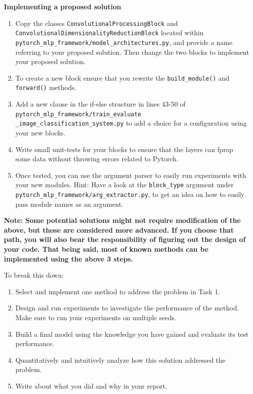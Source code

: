 \documentclass[11pt,]{article}
\begin{document}
\textbf{Implementing a proposed solution}

\begin{enumerate}
    \item Copy the classes \texttt{ConvolutionalProcessingBlock} and \texttt{ConvolutionalDimensionalityReductionBlock} located within \texttt{pytorch\_mlp\_framework/model\_architectures.py}, and provide a name referring to your proposed solution. Then change the two blocks to implement your proposed solution.
    \item To create a new block ensure that you rewrite the \texttt{build\_module()} and \texttt{forward()} methods.
    \item Add a new clause in the if-else structure in lines 43-50 of  \texttt{pytorch\_mlp\_framework/train\_evaluate} \texttt{\_image\_classification\_system.py} to add a choice for a configuration using your new blocks.
    \item Write small unit-tests for your blocks to ensure that the layers can fprop some data without throwing errors related to Pytorch.
    \item Once tested, you can use the argument parser to easily run experiments with your new modules. Hint: Have a look at the \texttt{block\_type} argument under \texttt{pytorch\_mlp\_framework/arg\_extractor.py}, to get an idea on how to easily pass module names as an argument.
\end{enumerate}

\textbf{Note: Some potential solutions might not require modification of the above, but those are considered more advanced. If you choose that path, you will also bear the responsibility of figuring out the design of your code. That being said, most of known methods can be implemented using the above 3 steps.}

To break this down:

\begin{enumerate}
    \item Select and implement one method to address the problem in Task 1.
    \item Design and run experiments to investigate the performance of the method. Make sure to run your experiments on multiple seeds. 
    \item Build a final model using the knowledge you have gained and evaluate its test performance.
    \item Quantitatively and intuitively analyze how this solution addressed the problem. 
    \item Write about what you did and why in your report.
\end{enumerate}
\end{document}
